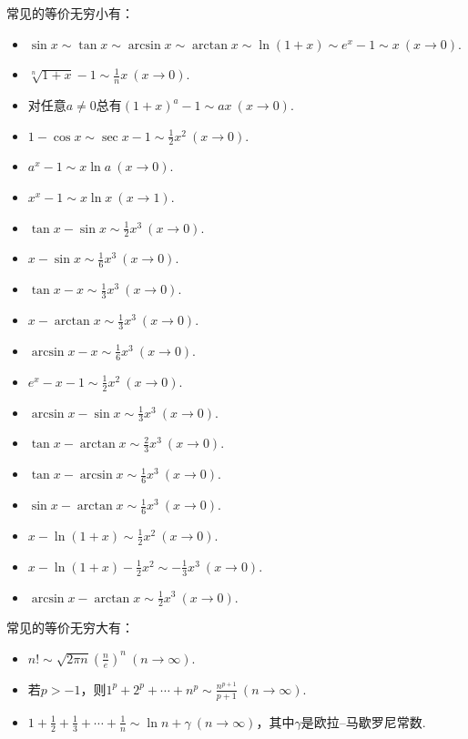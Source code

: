 常见的等价无穷小有：
\begin{itemize}
	\item \(\sin x%
		\sim \tan x%
		\sim \arcsin x%
		\sim \arctan x%
		\sim \ln(1+x)%
		\sim e^x-1%
		\sim x\ (x\to0)\).
	\item \(\sqrt[n]{1+x} - 1 \sim \frac1n x\ (x\to0)\).
	\item 对任意\(a\neq0\)总有\((1+x)^a-1 \sim ax\ (x\to0)\).%
	\item \(1-\cos x%
		\sim \sec x-1%
		\sim \frac12 x^2\ (x\to0)\).
	\item \(a^x-1 \sim x \ln a\ (x\to0)\).%
	\item \(x^x-1 \sim x \ln x\ (x\to1)\).%
	\item \(\tan x - \sin x \sim \frac12 x^3\ (x\to0)\).
	\item \(x - \sin x \sim \frac16 x^3\ (x\to0)\).
	\item \(\tan x - x \sim \frac13 x^3\ (x\to0)\).
	\item \(x - \arctan x \sim \frac13 x^3\ (x\to0)\).
	\item \(\arcsin x - x \sim \frac16 x^3\ (x\to0)\).
	\item \(e^x - x - 1 \sim \frac12 x^2\ (x\to0)\).
	\item \(\arcsin x - \sin x \sim \frac13 x^3\ (x\to0)\).
	\item \(\tan x - \arctan x \sim \frac23 x^3\ (x\to0)\).
	\item \(\tan x - \arcsin x \sim \frac16 x^3\ (x\to0)\).
	\item \(\sin x - \arctan x \sim \frac16 x^3\ (x\to0)\).
	\item \(x - \ln(1+x) \sim \frac12 x^2\ (x\to0)\).
	\item \(x - \ln(1+x) - \frac12 x^2 \sim -\frac13 x^3\ (x\to0)\).
	\item \(\arcsin x - \arctan x \sim \frac12 x^3\ (x\to0)\).
\end{itemize}

常见的等价无穷大有：
\begin{itemize}
	\item \(n! \sim \sqrt{2 \pi n} \left( \frac{n}{e} \right)^n\ (n\to\infty)\).
	\item 若\(p>-1\)，则\(1^p+2^p+\dotsb+n^p \sim \frac{n^{p+1}}{p+1}\ (n\to\infty)\).%
	\item \(1+\frac12+\frac13+\dotsb+\frac1n \sim \ln n + \gamma\ (n\to\infty)\)，其中\(\gamma\)是欧拉--马歇罗尼常数.%
\end{itemize}

